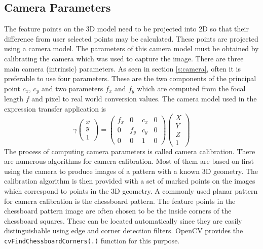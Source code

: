 \documentclass[11pt,a4paper,twoside]{report}
\begin{document}
\subsection{Camera Parameters}
The feature points on the 3D model need to be projected into 2D so that their
difference from user selected points may be calculated. These points are projected
using a camera model. The parameters of this camera model must be obtained by calibrating the camera which
was used to capture the image. There are three main camera (intrinsic) parameters. As seen in section \ref{s:camera}, often it is preferable to use
four parameters. These are the two components of the principal point $c_x$,
$c_y$ and two parameters $f_x$ and $f_y$ which are computed from the focal
length $f$ and pixel to real world conversion values. The camera model used in
the expression transfer application is
\begin{equation}\label{eq:projective}
\gamma\begin{pmatrix}x\\y\\1\end{pmatrix}
= \begin{pmatrix}f_x&0&c_x&0\\0&f_y&c_y&0\\0&0&1&0\end{pmatrix} \begin{pmatrix}X\\Y\\Z\\1\end{pmatrix}
\end{equation}
The process of computing camera parameters is called camera calibration. There
are numerous algorithms for camera calibration. Most of them are based on first
using the camera to produce images of a pattern with a known 3D geometry. The calibration algorithm is then
provided with a set of marked points on the images which correspond to points in
the 3D geometry. A commonly used planar pattern for camera calibration is
the chessboard pattern. The feature points in the chessboard pattern image are
often chosen to be the inside corners of the chessboard squares. These can
be located automatically since they are easily distinguishable using edge and
corner detection filters. OpenCV provides the
\texttt{cvFindChessboardCorners(.)} function for this purpose.
\end{document}
